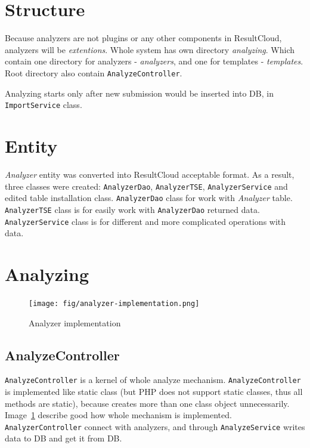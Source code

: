 \section{Structure}

Because analyzers are not plugins or any other components in ResultCloud, analyzers will be \emph{extentions}. Whole system has own directory \emph{analyzing}. Which contain one directory for analyzers - \emph{analyzers}, and one for templates - \emph{templates}. Root directory also contain \texttt{AnalyzeController}.

Analyzing starts only after new submission would be inserted into DB, in \texttt{ImportService} class.

\section{Entity}

\emph{Analyzer} entity was converted into ResultCloud acceptable format. As a result, three classes were created: \texttt{AnalyzerDao}, \texttt{AnalyzerTSE}, \texttt{AnalyzerService} and edited table installation class. \texttt{AnalyzerDao} class for work with \emph{Analyzer} table. \texttt{AnalyzerTSE} class is for easily work with \texttt{AnalyzerDao} returned data. \texttt{AnalyzerService} class is for different and more complicated operations with data.

\section{Analyzing}

\begin{figure}
  \centering
    \texttt{[image: fig/analyzer-implementation.png]}
  \caption{Analyzer implementation}
  \label{fig:an_impl}
\end{figure}

\subsection{AnalyzeController}

\texttt{AnalyzeController} is a kernel of whole analyze mechanism. \texttt{AnalyzeController} is implemented like static class (but PHP does not support static classes, thus all methods are static), because creates more than one class object unnecessarily. Image\ \ref{fig:an_impl} describe good how whole mechanism is implemented. \texttt{AnalyzerController} connect with analyzers, and through \texttt{AnalyzeService} writes data to DB and get it from DB.

